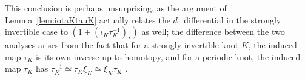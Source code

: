 \documentclass[11pt,reqno]{amsart}
\theoremstyle{definition}
\theoremstyle{remark}
\numberwithin{equation}{section}
\begin{document}
This conclusion is perhaps unsurprising, as the argument of Lemma~\ref{lem:iotaKtauK} actually relates the $d_1$ differential in the strongly invertible case to $(1+(\iota_K\tau_K^{-1})_*)$ as well; the difference between the two analyses arises from the fact that for a strongly invertible knot $K$, the induced map $\tau_K$ is its own inverse up to homotopy, and for a periodic knot, the induced map $\tau_K$ has $\tau_K^{-1} \simeq \tau_K \xi_K \simeq \xi_K \tau_K$ \cite[Theorem 8.1]{DMS:equivariant}.
%



\def\MR#1{}

\end{document}
